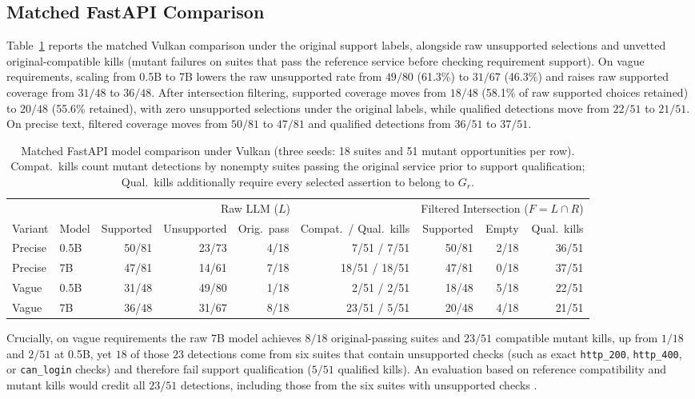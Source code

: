 \subsection{Matched FastAPI Comparison}
Table~\ref{tab:api-model-size} reports the matched Vulkan comparison under the original support labels, alongside raw unsupported selections and unvetted original-compatible kills (mutant failures on suites that pass the reference service before checking requirement support). On vague requirements, scaling from 0.5B to 7B lowers the raw unsupported rate from $49/80$ (61.3\%) to $31/67$ (46.3\%) and raises raw supported coverage from $31/48$ to $36/48$. After intersection filtering, supported coverage moves from $18/48$ (58.1\% of raw supported choices retained) to $20/48$ (55.6\% retained), with zero unsupported selections under the original labels, while qualified detections move from $22/51$ to $21/51$. On precise text, filtered coverage moves from $50/81$ to $47/81$ and qualified detections from $36/51$ to $37/51$.

\begin{table}[t]
\caption{Matched FastAPI model comparison under Vulkan (three seeds: 18 suites and 51 mutant opportunities per row). Compat.\ kills count mutant detections by nonempty suites passing the original service prior to support qualification; Qual.\ kills additionally require every selected assertion to belong to $G_r$.}
\label{tab:api-model-size}
\centering\small
\begin{tabular}{llrrrrrrr}
\toprule
 & & \multicolumn{4}{c}{Raw LLM ($L$)} & \multicolumn{3}{c}{Filtered Intersection ($F=L\cap R$)}\\
\cmidrule(lr){3-6}\cmidrule(lr){7-9}
Variant & Model & Supported & Unsupported & Orig.\ pass & Compat.\ / Qual.\ kills & Supported & Empty & Qual.\ kills\\
\midrule
Precise & 0.5B & 50/81 & 23/73 & 4/18 & 7/51 / \phantom{0}7/51 & 50/81 & 2/18 & 36/51\\
Precise & 7B   & 47/81 & 14/61 & 7/18 & 18/51 / 18/51 & 47/81 & 0/18 & 37/51\\
\midrule
Vague   & 0.5B & 31/48 & 49/80 & 1/18 & 2/51 / \phantom{0}2/51 & 18/48 & 5/18 & 22/51\\
Vague   & 7B   & 36/48 & 31/67 & 8/18 & 23/51 / \phantom{0}5/51 & 20/48 & 4/18 & 21/51\\
\bottomrule
\end{tabular}
\end{table}

Crucially, on vague requirements the raw 7B model achieves $8/18$ original-passing suites and $23/51$ compatible mutant kills, up from $1/18$ and $2/51$ at 0.5B, yet $18$ of those $23$ detections come from six suites that contain unsupported checks (such as exact \texttt{http\_200}, \texttt{http\_400}, or \texttt{can\_login} checks) and therefore fail support qualification ($5/51$ qualified kills). An evaluation based on reference compatibility and mutant kills would credit all $23/51$ detections, including those from the six suites with unsupported checks \cite{konstantinou2024,ding2026}.


